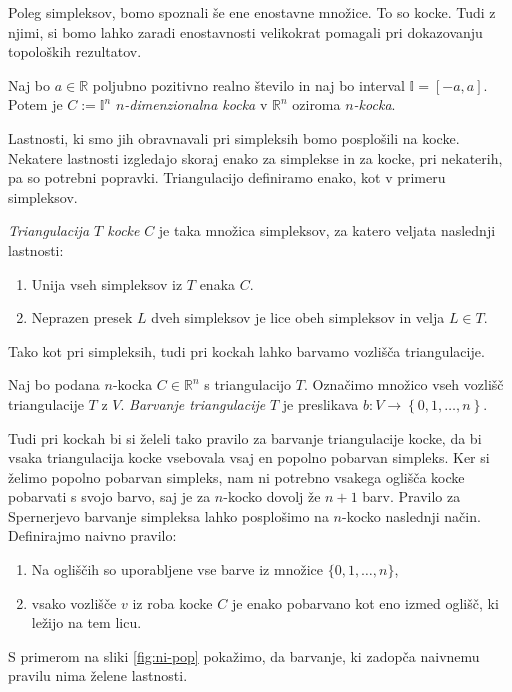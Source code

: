 \documentclass[mat1]{fmfdelo}
\newcommand{\R}{\mathbb R}
\newcommand{\I}{\mathbb I}
\newcommand{\0}{\underline{0}}
\begin{document}
Poleg simpleksov, bomo spoznali še ene enostavne množice. To so kocke. Tudi z njimi, si bomo lahko zaradi enostavnosti velikokrat pomagali pri dokazovanju topoloških rezultatov. 
\begin{definicija}
Naj bo $a \in \R$ poljubno pozitivno realno število in naj bo interval $\I = \left [ -a, a \right ] $. Potem je $C := \I^n$ \emph{$n$-dimenzionalna kocka} v $\R^n$ oziroma \emph{$n$-kocka}.
\end{definicija}
Lastnosti, ki smo jih obravnavali pri simpleksih bomo posplošili na kocke. Nekatere lastnosti izgledajo skoraj enako za simplekse in za kocke, pri nekaterih, pa so potrebni popravki.
Triangulacijo definiramo enako, kot v primeru simpleksov.
\begin{definicija}
\emph{Triangulacija $T$ kocke} $C$ je taka množica simpleksov, za katero veljata naslednji lastnosti:
\begin{enumerate}
\item Unija vseh simpleksov iz $T$ enaka $C$.
\item Neprazen presek $L$ dveh simpleksov je lice obeh simpleksov in velja $L \in T$.
\end{enumerate}
\end{definicija}
Tako kot pri simpleksih, tudi pri kockah lahko barvamo vozlišča triangulacije.
\begin{definicija}
Naj bo podana $n$-kocka $C \in \R^n$ s triangulacijo $T$. Označimo množico vseh vozlišč triangulacije $T$ z $V$. \emph{Barvanje triangulacije} $T$ je preslikava $b : V \to \left \{0, 1, \dots, n \right \}$.
\end{definicija}
Tudi pri kockah bi si želeli tako pravilo za barvanje triangulacije kocke, da bi vsaka triangulacija kocke vsebovala vsaj en popolno pobarvan simpleks. Ker si želimo popolno pobarvan simpleks, nam ni potrebno vsakega oglišča kocke pobarvati s svojo barvo, saj je za $n$-kocko dovolj že $n+1$ barv.  Pravilo za Spernerjevo barvanje simpleksa lahko posplošimo na $n$-kocko naslednji način.
Definirajmo naivno pravilo:
\begin{enumerate}
\item Na ogliščih so uporabljene vse barve iz množice $\{0, 1, \dots, n \}$,
\item vsako vozlišče $v$ iz roba kocke $C$ je enako pobarvano kot eno izmed oglišč, ki ležijo na tem licu.
\end{enumerate}
S primerom na sliki \ref{fig:ni-pop} pokažimo, da barvanje, ki zadopča naivnemu pravilu nima želene lastnosti.
\end{document}
